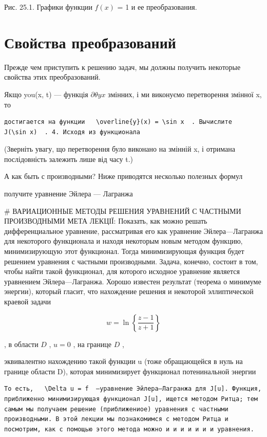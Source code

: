 \documentclass[
  ukrainian,
]{article}
\begin{document}
Рис. 25.1. Графики функции \(f(x)\) = 1 и ее преобразования.

\section{Свойства
преобразований}\label{ux441ux432ux43eux439ux441ux442ux432ux430-ux43fux440ux435ux43eux431ux440ux430ux437ux43eux432ux430ux43dux438ux439-1}

Прежде чем приступить к решению задач, мы должны получить некоторые
свойства этих преобразований.

Якщо you(x, t) --- функція \(\partial \theta yx\) змінних, і ми
виконуємо перетворення змінної x, то

\begin{verbatim}
достигается на функции   \overline{y}(x) = \sin x  . Вычислите   J(\sin x)  . 4. Исходя из функционала
\end{verbatim}

(Зверніть увагу, що перетворення було виконано на змінній x, і отримана
послідовність залежить лише від часу t.)

А как быть с производными? Ниже приводятся несколько полезных формул

получите уравнение Эйлера --- Лагранжа

\# ВАРИАЦИОННЫЕ МЕТОДЫ РЕШЕНИЯ УРАВНЕНИЙ С ЧАСТНЫМИ ПРОИЗВОДНЫМИ МЕТА
ЛЕКЦІЇ: Показать, как можно решать дифференциальное уравнение,
рассматривая его как уравнение Эйлера---Лагранжа для некоторого
функционала и находя некоторым новым методом функцию, минимизирующую
этот функционал. Тогда минимизирующая функция будет решением уравнения с
частными производными. Задача, конечно, состоит в том, чтобы найти такой
функционал, для которого исходное уравнение является уравнением
Эйлера---Лагранжа. Хорошо известен результат (теорема о минимуме
энергии), который гласит, что нахождение решения и некоторой
эллиптической краевой задачи

\[
w = \ln\left\{\frac{z-1}{z+1}\right\}
\]

, в области \(D\) , \(u = 0\) , на границе \(D\) ,

эквивалентно нахождению такой функции u (тоже обращающейся в нуль на
границе области D), которая минимизирует функционал потенинальной
энергии

\begin{verbatim}
То есть,   \Delta u = f  —уравнение Эйлера—Лагранжа для J[u]. Функция, приближенно минимизирующая функционал J[u], ищется методом Ритца; тем самым мы получаем решение (приближениое) уравнения с частными производными. В этой лекции мы познакомимся с методом Ритца и посмотрим, как с помощью этого метода можно и и и и и и и уравнения.
\end{verbatim}
\end{document}
